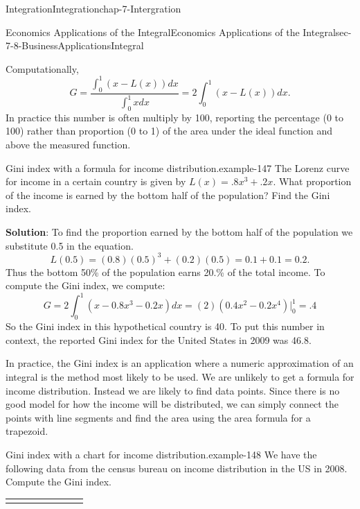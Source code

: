 \documentclass[oneside,10pt,]{book}
\newcommand{\terminology}[1]{\textbf{#1}}
\numberwithin{equation}{section}
\newcommand{\hrulethick} {\noalign{\hrule height 0.11em}}
\begin{document}
\begin{chapterptx}{Integration}{}{Integration}{}{}{chap-7-Intergration}
\begin{sectionptx}{Economics Applications of the Integral}{}{Economics Applications of the Integral}{}{}{sec-7-8-BusinessApplicationsIntegral}
\par
\hypertarget{p-3114}{}%
Computationally,%
%
\begin{equation*}
G=\frac{\int_0^1 (x-L(x))dx}{\int_0^1 x  dx}=2\int_0^1 (x-L(x))dx.
\end{equation*}
\hypertarget{p-3115}{}%
In practice this number is often multiply by 100, reporting the percentage (0 to 100) rather than proportion (0 to 1) of the area under the ideal function and above the measured function.%
\begin{example}{Gini index with a formula for income distribution.}{example-147}%
\hypertarget{p-3116}{}%
The Lorenz curve for income in a certain country is given by \(L(x)=.8x^3+.2x\).  What proportion of the income is earned by the bottom half of the population?  Find the Gini index.%
\par
\hypertarget{p-3117}{}%
\terminology{Solution}: To find the proportion earned by the bottom half of the population we substitute 0.5 in the equation.%
%
\begin{equation*}
L(0.5)=(0.8) (0.5)^3+(0.2)(0.5)=0.1+0.1=0.2.
\end{equation*}
\hypertarget{p-3118}{}%
Thus the bottom 50\% of the population earns 20.\% of the total income. To compute the Gini index, we compute:%
%
\begin{equation*}
G=2\int_0^1 (x-0.8x^3-0.2x)dx=(2)(0.4x^2-0.2x^4 ) |_0^1=.4
\end{equation*}
\hypertarget{p-3119}{}%
So the Gini index in this hypothetical country is 40.  To put this number in context, the reported Gini index for the United States in 2009 was 46.8.%
\end{example}
\hypertarget{p-3120}{}%
In practice, the Gini index is an application where a numeric approximation of an integral is the method most likely to be used.  We are unlikely to get a formula for income distribution.  Instead we are likely to find data points.  Since there is no good model for how the income will be distributed, we can simply connect the points with line segments and find the area using the area formula for a trapezoid.%
\begin{example}{Gini index with a chart for income distribution.}{example-148}%
\hypertarget{p-3121}{}%
We have the following data from the census bureau on income distribution in the US in 2008.  Compute the Gini index.%
\begin{sidebyside}{1}{0}{0}{0}%
\begin{sbspanel}{1}%
{\centering%
\begin{tabular}{cccccccc}\hrulethick

\end{tabular}}
\end{sbspanel}
\end{sidebyside}
\end{example}
\end{sectionptx}
\end{chapterptx}
\end{document}
